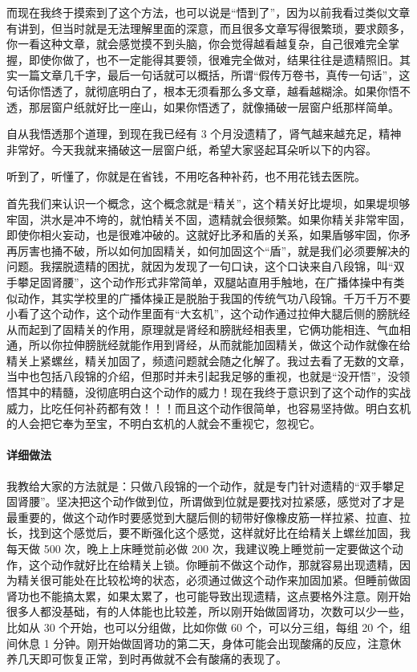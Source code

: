 \documentclass[fontset=founder]{ctexart}
\begin{document}
而现在我终于摸索到了这个方法，也可以说是“悟到了”，因为以前我看过类似文章有讲到，但当时就是无法理解里面的深意，而且很多文章写得很繁琐，要求颇多，你一看这种文章，就会感觉摸不到头脑，你会觉得越看越复杂，自己很难完全掌握，即使你做了，也不一定能得其要领，很难完全做对，结果往往是遗精照旧。其实一篇文章几千字，最后一句话就可以概括，所谓“假传万卷书，真传一句话”，这句话你悟透了，就彻底明白了，根本无须看那么多文章，越看越糊涂。如果你悟不透，那层窗户纸就好比一座山，如果你悟透了，就像捅破一层窗户纸那样简单。

自从我悟透那个道理，到现在我已经有 3 个月没遗精了，肾气越来越充足，精神非常好。今天我就来捅破这一层窗户纸，希望大家竖起耳朵听以下的内容。

听到了，听懂了，你就是在省钱，不用吃各种补药，也不用花钱去医院。

首先我们来认识一个概念，这个概念就是“精关”，这个精关好比堤坝，如果堤坝够牢固，洪水是冲不垮的，就怕精关不固，遗精就会很频繁。如果你精关非常牢固，即使你相火妄动，也是很难冲破的。这就好比矛和盾的关系，如果盾够牢固，你矛再厉害也捅不破，所以如何加固精关，如何加固这个“盾”，就是我们必须要解决的问题。我摆脱遗精的困扰，就因为发现了一句口诀，这个口诀来自八段锦，叫“双手攀足固肾腰”，这个动作形式非常简单，双腿站直用手触地，在广播体操中有类似动作，其实学校里的广播体操正是脱胎于我国的传统气功八段锦。千万千万不要小看了这个动作，这个动作里面有“大玄机”，这个动作通过拉伸大腿后侧的膀胱经从而起到了固精关的作用，原理就是肾经和膀胱经相表里，它俩功能相连、气血相通，所以你拉伸膀胱经就能作用到肾经，从而就能加固精关，做这个动作就像在给精关上紧螺丝，精关加固了，频遗问题就会随之化解了。我过去看了无数的文章，当中也包括八段锦的介绍，但那时并未引起我足够的重视，也就是“没开悟”，没领悟其中的精髓，没彻底明白这个动作的威力！现在我终于意识到了这个动作的实战威力，比吃任何补药都有效！！！而且这个动作很简单，也容易坚持做。明白玄机的人会把它奉为至宝，不明白玄机的人就会不重视它，忽视它。

\paragraph{详细做法}

我教给大家的方法就是：只做八段锦的一个动作，就是专门针对遗精的“双手攀足固肾腰”。坚决把这个动作做到位，所谓做到位就是要找对拉紧感，感觉对了才是最重要的，做这个动作时要感觉到大腿后侧的韧带好像橡皮筋一样拉紧、拉直、拉长，找到这个感觉后，要不断强化这个感觉，这样就好比在给精关上螺丝加固，我每天做 500 次，晚上上床睡觉前必做 200 次，我建议晚上睡觉前一定要做这个动作，这个动作就好比在给精关上锁。你睡前不做这个动作，那就容易出现遗精，因为精关很可能处在比较松垮的状态，必须通过做这个动作来加固加紧。但睡前做固肾功也不能搞太累，如果太累了，也可能导致出现遗精，这点要格外注意。刚开始很多人都没基础，有的人体能也比较差，所以刚开始做固肾功，次数可以少一些，比如从 30 个开始，也可以分组做，比如你做 60 个，可以分三组，每组 20 个，组间休息 1 分钟。刚开始做固肾功的第二天，身体可能会出现酸痛的反应，注意休养几天即可恢复正常，到时再做就不会有酸痛的表现了。
\end{document}
